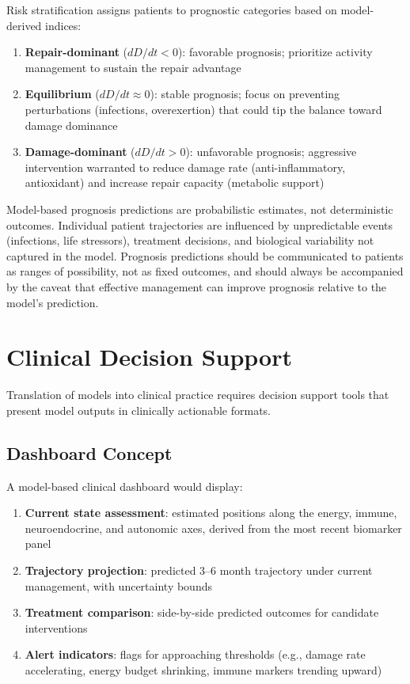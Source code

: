 Risk stratification assigns patients to prognostic categories based on model-derived indices:

\begin{enumerate}
    \item \textbf{Repair-dominant} ($dD/dt < 0$): favorable prognosis; prioritize activity management to sustain the repair advantage
    \item \textbf{Equilibrium} ($dD/dt \approx 0$): stable prognosis; focus on preventing perturbations (infections, overexertion) that could tip the balance toward damage dominance
    \item \textbf{Damage-dominant} ($dD/dt > 0$): unfavorable prognosis; aggressive intervention warranted to reduce damage rate (anti-inflammatory, antioxidant) and increase repair capacity (metabolic support)
\end{enumerate}

\begin{warning}
Model-based prognosis predictions are probabilistic estimates, not deterministic outcomes. Individual patient trajectories are influenced by unpredictable events (infections, life stressors), treatment decisions, and biological variability not captured in the model. Prognosis predictions should be communicated to patients as ranges of possibility, not as fixed outcomes, and should always be accompanied by the caveat that effective management can improve prognosis relative to the model's prediction.
\end{warning}

\section{Clinical Decision Support}
\label{sec:clinical-decision-support}

Translation of models into clinical practice requires decision support tools that present model outputs in clinically actionable formats.

\subsection{Dashboard Concept}

A model-based clinical dashboard would display:

\begin{enumerate}
    \item \textbf{Current state assessment}: estimated positions along the energy, immune, neuroendocrine, and autonomic axes, derived from the most recent biomarker panel
    \item \textbf{Trajectory projection}: predicted 3--6 month trajectory under current management, with uncertainty bounds
    \item \textbf{Treatment comparison}: side-by-side predicted outcomes for candidate interventions
    \item \textbf{Alert indicators}: flags for approaching thresholds (e.g., damage rate accelerating, energy budget shrinking, immune markers trending upward)
\end{enumerate}

